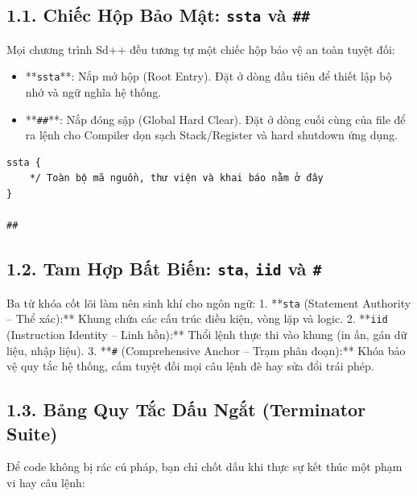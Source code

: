 \documentclass[11pt, a4paper]{article}
\begin{document}
\subsection{1.1. Chiếc Hộp Bảo Mật: \texttt{ssta} và \texttt{\#\#}}
Mọi chương trình Sd++ đều tương tự một chiếc hộp bảo vệ an toàn tuyệt đối:
\begin{itemize}
    \item **\texttt{ssta}**: Nắp mở hộp (Root Entry). Đặt ở dòng đầu tiên để thiết lập bộ nhớ và ngữ nghĩa hệ thống.
    \item **\texttt{\#\#}**: Nắp đóng sập (Global Hard Clear). Đặt ở dòng cuối cùng của file để ra lệnh cho Compiler dọn sạch Stack/Register và hard shutdown ứng dụng.
\end{itemize}

\begin{lstlisting}[caption={Cấu trúc khung nguyên thủy chuẩn của một chương trình Sd++}]
ssta {
    */ Toàn bộ mã nguồn, thư viện và khai báo nằm ở đây
}

##
\end{lstlisting}

\subsection{1.2. Tam Hợp Bất Biến: \texttt{sta}, \texttt{iid} và \texttt{\#}}
Ba từ khóa cốt lõi làm nên sinh khí cho ngôn ngữ:
1. **\texttt{sta} (Statement Authority -- Thể xác):** Khung chứa các cấu trúc điều kiện, vòng lặp và logic.
2. **\texttt{iid} (Instruction Identity -- Linh hồn):** Thổi lệnh thực thi vào khung (in ấn, gán dữ liệu, nhập liệu).
3. **\texttt{\#} (Comprehensive Anchor -- Trạm phân đoạn):** Khóa bảo vệ quy tắc hệ thống, cấm tuyệt đối mọi câu lệnh đè hay sửa đổi trái phép.

\subsection{1.3. Bảng Quy Tắc Dấu Ngắt (Terminator Suite)}
Để code không bị rác cú pháp, bạn chỉ chốt dấu khi thực sự kết thúc một phạm vi hay câu lệnh:
\end{document}

